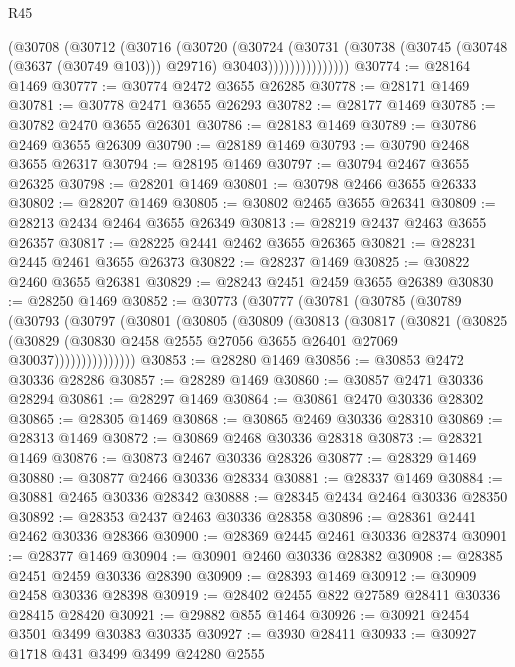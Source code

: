 \begin{lexlean}{R45}
\begin{coremodule}
                    (@30708
                      (@30712
                        (@30716
                          (@30720
                            (@30724
                              (@30731
                                (@30738
                                  (@30745 (@30748 (@3637 (@30749 @103))) @29716)
                                  @30403)))))))))))))))
@30774 := @28164 @1469
@30777 := @30774 @2472 @3655 @26285
@30778 := @28171 @1469
@30781 := @30778 @2471 @3655 @26293
@30782 := @28177 @1469
@30785 := @30782 @2470 @3655 @26301
@30786 := @28183 @1469
@30789 := @30786 @2469 @3655 @26309
@30790 := @28189 @1469
@30793 := @30790 @2468 @3655 @26317
@30794 := @28195 @1469
@30797 := @30794 @2467 @3655 @26325
@30798 := @28201 @1469
@30801 := @30798 @2466 @3655 @26333
@30802 := @28207 @1469
@30805 := @30802 @2465 @3655 @26341
@30809 := @28213 @2434 @2464 @3655 @26349
@30813 := @28219 @2437 @2463 @3655 @26357
@30817 := @28225 @2441 @2462 @3655 @26365
@30821 := @28231 @2445 @2461 @3655 @26373
@30822 := @28237 @1469
@30825 := @30822 @2460 @3655 @26381
@30829 := @28243 @2451 @2459 @3655 @26389
@30830 := @28250 @1469
@30852 := @30773
    (@30777
      (@30781
        (@30785
          (@30789
            (@30793
              (@30797
                (@30801
                  (@30805
                    (@30809
                      (@30813
                        (@30817
                          (@30821
                            (@30825
                              (@30829
                                (@30830 @2458 @2555 @27056 @3655 @26401 @27069 @30037)))))))))))))))
@30853 := @28280 @1469
@30856 := @30853 @2472 @30336 @28286
@30857 := @28289 @1469
@30860 := @30857 @2471 @30336 @28294
@30861 := @28297 @1469
@30864 := @30861 @2470 @30336 @28302
@30865 := @28305 @1469
@30868 := @30865 @2469 @30336 @28310
@30869 := @28313 @1469
@30872 := @30869 @2468 @30336 @28318
@30873 := @28321 @1469
@30876 := @30873 @2467 @30336 @28326
@30877 := @28329 @1469
@30880 := @30877 @2466 @30336 @28334
@30881 := @28337 @1469
@30884 := @30881 @2465 @30336 @28342
@30888 := @28345 @2434 @2464 @30336 @28350
@30892 := @28353 @2437 @2463 @30336 @28358
@30896 := @28361 @2441 @2462 @30336 @28366
@30900 := @28369 @2445 @2461 @30336 @28374
@30901 := @28377 @1469
@30904 := @30901 @2460 @30336 @28382
@30908 := @28385 @2451 @2459 @30336 @28390
@30909 := @28393 @1469
@30912 := @30909 @2458 @30336 @28398
@30919 := @28402 @2455 @822 @27589 @28411 @30336 @28415 @28420
@30921 := @29882 @855 @1464
@30926 := @30921 @2454 @3501 @3499 @30383 @30335
@30927 := @3930 @28411
@30933 := @30927 @1718 @431 @3499 @3499 @24280 @2555

\end{coremodule}
\end{lexlean}
